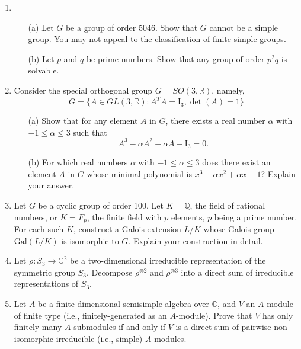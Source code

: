 \documentclass{article}
\begin{document}
\begin{enumerate}
    \item 
    \begin{itemize}
        \item[(a)] Let \(G\) be a group of order 5046. Show that \(G\) cannot be a simple group. You may not appeal to the classification of finite simple groups.
        \item[(b)] Let \(p\) and \(q\) be prime numbers. Show that any group of order \(p^2q\) is solvable.
    \end{itemize}

    \item Consider the special orthogonal group \(G=SO(3,\mathbb{R})\), namely,
    \[G=\{A\in GL(3,\mathbb{R}): A^T A=\mathrm{I}_3, \det(A)=1\}\]
    \begin{itemize}
        \item[(a)] Show that for any element \(A\) in \(G\), there exists a real number \(\alpha\) with \(-1\leq\alpha\leq 3\) such that
        \[A^3-\alpha A^2+\alpha A-\mathrm{I}_3=0.\]
        \item[(b)] For which real numbers \(\alpha\) with \(-1\leq\alpha\leq 3\) does there exist an element \(A\) in \(G\) whose minimal polynomial is \(x^3-\alpha x^2+\alpha x-1\)? Explain your answer.
    \end{itemize}

    \item Let \(G\) be a cyclic group of order 100. Let \(K=\mathbb{Q}\), the field of rational numbers, or \(K=F_p\), the finite field with \(p\) elements, \(p\) being a prime number. For each such \(K\), construct a Galois extension \(L/K\) whose Galois group \(\text{Gal}(L/K)\) is isomorphic to \(G\). Explain your construction in detail.

    \item Let \(\rho:S_3\to\mathbb{C}^2\) be a two-dimensional irreducible representation of the symmetric group \(S_3\). Decompose \(\rho^{\otimes 2}\) and \(\rho^{\otimes 3}\) into a direct sum of irreducible representations of \(S_3\).

    \item Let \(A\) be a finite-dimensional semisimple algebra over \(\mathbb{C}\), and \(V\) an \(A\)-module of finite type (i.e., finitely-generated as an \(A\)-module). Prove that \(V\) has only finitely many \(A\)-submodules if and only if \(V\) is a direct sum of pairwise non-isomorphic irreducible (i.e., simple) \(A\)-modules.
\end{enumerate}
\end{document}
